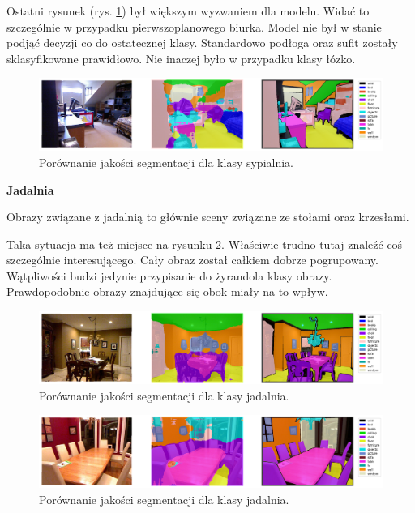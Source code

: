 Ostatni rysunek (rys. \ref{fig:bedroom-pred-3}) był większym wyzwaniem dla modelu. Widać to szczególnie w przypadku pierwszoplanowego biurka. Model nie był w stanie podjąć decyzji co do ostatecznej klasy. Standardowo podłoga oraz sufit zostały sklasyfikowane prawidłowo. Nie inaczej było w przypadku klasy łózko.
\begin{figure}[ht!]
    \centering
    \includegraphics[width=\textwidth]{img/preds_analysis/gt_vs_pred/bedroom-3.png}
    \caption{Porównanie jakości segmentacji dla klasy sypialnia.}
    \label{fig:bedroom-pred-3}
\end{figure}

\noindent
\textbf{Jadalnia}


Obrazy związane z jadalnią to głównie sceny związane ze stołami oraz krzesłami.

Taka sytuacja ma też miejsce na rysunku \ref{fig:dining_room-pred-1}. Właściwie trudno tutaj znaleźć coś szczególnie interesującego. Cały obraz został całkiem dobrze pogrupowany. Wątpliwości budzi jedynie przypisanie do żyrandola klasy obrazy. Prawdopodobnie obrazy znajdujące się obok miały na to wpływ.


\begin{figure}[ht!]
    \centering
    \includegraphics[width=\textwidth]{img/preds_analysis/gt_vs_pred/dining_room-1.png}
    \caption{Porównanie jakości segmentacji dla klasy jadalnia.}
    \label{fig:dining_room-pred-1}
\end{figure}
\begin{figure}[ht!]
    \centering
    \includegraphics[width=\textwidth]{img/preds_analysis/gt_vs_pred/dining_room-2.png}
    \caption{Porównanie jakości segmentacji dla klasy jadalnia.}
    \label{fig:dining_room-pred-2}
\end{figure}

